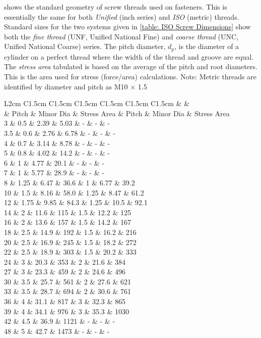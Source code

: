 \documentclass[a4paper,openany,12pt]{book}
\begin{document}
{{shows the standard geometry of screw threads used on fasteners. This is
essentially the same for both \emph{Unified} (inch series) and \emph{ISO} (metric)
threads. Standard sizes for the two systems given in
\ref{table: ISO Screw Dimensions} show
both the \emph{fine thread} (UNF, Unified National Fine) and \emph{coarse thread}
(UNC, Unified National Coarse) series. The pitch diameter, \(d_p\), is the
diameter of a cylinder on a perfect thread where the width of the thread
and groove are equal. The \emph{stress area} tabulated is based on the
average of the pitch and root diameters. This is the area used for
stress (force/area) calculations. Note: Metric threads are identified by
diameter and pitch as M10 \(\times\) 1.5


 L2cm C1.5cm C1.5cm C1.5cm C1.5cm C1.5cm C1.5cm \& \&\\
\& Pitch \& Minor Dia \& Stress Area \& Pitch \& Minor Dia \& Stress Area\\
3 \& 0.5 \& 2.39 \& 5.03 \& - \& - \& -\\
3.5 \& 0.6 \& 2.76 \& 6.78 \& - \& - \& -\\
4 \& 0.7 \& 3.14 \& 8.78 \& - \& - \& -\\
5 \& 0.8 \& 4.02 \& 14.2 \& - \& - \& -\\
6 \& 1 \& 4.77 \& 20.1 \& - \& - \& -\\
7 \& 1 \& 5.77 \& 28.9 \& - \& - \& -\\
8 \& 1.25 \& 6.47 \& 36.6 \& 1 \& 6.77 \& 39.2\\
10 \& 1.5 \& 8.16 \& 58.0 \& 1.25 \& 8.47 \& 61.2\\
12 \& 1.75 \& 9.85 \& 84.3 \& 1.25 \& 10.5 \& 92.1\\
14 \& 2 \& 11.6 \& 115 \& 1.5 \& 12.2 \& 125\\
16 \& 2 \& 13.6 \& 157 \& 1.5 \& 14.2 \& 167\\
18 \& 2.5 \& 14.9 \& 192 \& 1.5 \& 16.2 \& 216\\
20 \& 2.5 \& 16.9 \& 245 \& 1.5 \& 18.2 \& 272\\
22 \& 2.5 \& 18.9 \& 303 \& 1.5 \& 20.2 \& 333\\
24 \& 3 \& 20.3 \& 353 \& 2 \& 21.6 \& 384\\
27 \& 3 \& 23.3 \& 459 \& 2 \& 24.6 \& 496\\
30 \& 3.5 \& 25.7 \& 561 \& 2 \& 27.6 \& 621\\
33 \& 3.5 \& 28.7 \& 694 \& 2 \& 30.6 \& 761\\
36 \& 4 \& 31.1 \& 817 \& 3 \& 32.3 \& 865\\
39 \& 4 \& 34.1 \& 976 \& 3 \& 35.3 \& 1030\\
42 \& 4.5 \& 36.9 \& 1121 \& - \& - \& -\\
48 \& 5 \& 42.7 \& 1473 \& - \& - \& -\\

}}
\end{document}
